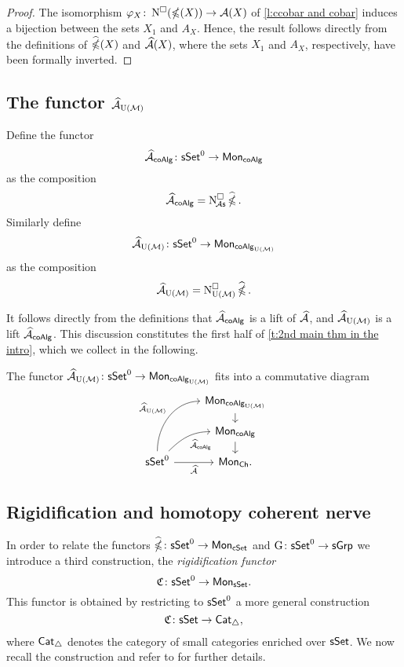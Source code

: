 \begin{proof}
	The isomorphism $\varphi_X \colon \cchains(\ccobar(X))\to \A(X)$
	of \cref{l:ccobar and cobar} induces a bijection between the sets
	$X_1$ and $A_X$.
	Hence, the result follows directly from the definitions of $\ccobarE(X)$ and $\Ahat(X)$, where the sets $X_1$ and $A_X$, respectively, have been formally inverted.
\end{proof}

\subsection{The functor $\Ahat_{\UM}$} \label{s:ahatum}

Define the functor
\[
\Ahat_{\coAlg} \colon \sSet^0 \to \Mon_{\coAlg}
\]
as the composition
\[
\Ahat_{\coAlg} = \cchainsA \ccobarE.
\]
Similarly define
\[
\Ahat_{\UM} \colon \sSet^0 \to \Mon_{\coAlg_{\UM}}
\]
as the composition
\[
\Ahat_{\UM} = \cchainsUM \ccobarE.
\]

It follows directly from the definitions that $\Ahat_{\coAlg}$ is a lift of $\Ahat$, and $\Ahat_{\UM}$ is a lift $\Ahat_{\coAlg}$.
This discussion constitutes the first half of \cref{t:2nd main thm in the intro}, which we collect in the following.

\begin{lemma} \label{l:AhatUM}
The functor $\Ahat_\UM \colon \sSet^0 \to \Mon_{\coAlg_\UM}$ fits into a commutative diagram
	\[
	\begin{tikzcd}[row sep=small]
	& \Mon_{\coAlg_\UM} \arrow[d] \\
	& \Mon_{\coAlg} \arrow[d] \\
	\sSet^0
	\arrow[r, "\Ahat"', ]
	\arrow[ru, "\Ahat_{\coAlg}"', out=45, in=180]
	\arrow[ruu, "\Ahat_\UM", out=90, in=180]
	& \Mon_{\Ch}.
	\end{tikzcd}
	\]
\end{lemma}

\subsection{Rigidification and homotopy coherent nerve}\label{ss:rigidification}

In order to relate the functors $\ccobarE \colon \sSet^0 \to \Mon_{\cSet}$ and $\kan \colon \sSet^0\to \sGrp$ we introduce a third construction, the \textit{rigidification functor}
\[
\rigid \colon \sSet^0 \to \Mon_{\sSet}.
\]
This functor is obtained by restricting to $\sSet^0$ a more general construction
\[
\rigid \colon \sSet \to \Cat_{\simplex},
\]
where $\Cat_{\simplex}$ denotes the category of small categories enriched over $\sSet$.
We now recall the construction and refer to \cite{dugger2011rigidification} for further details.


